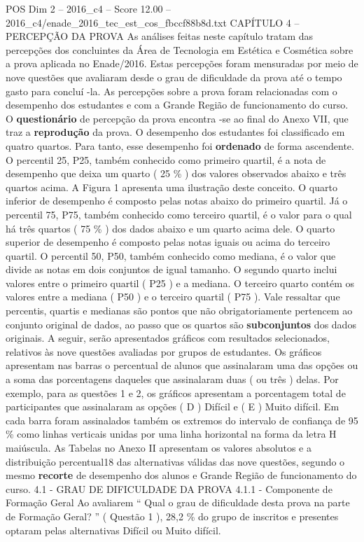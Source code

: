 \begin{textsample}{POS Dim 2 – 2016\_c4 – Score 12.00 – 2016\_c4/enade\_2016\_tec\_est\_cos\_fbccf88b8d.txt}  \label{ex:f2_pos_071}
CAPÍTULO 4 – PERCEPÇÃO DA PROVA As análises feitas neste capítulo tratam das percepções dos concluintes da Área de Tecnologia em Estética e Cosmética sobre a prova aplicada no Enade/2016.
Estas percepções foram mensuradas por meio de nove questões que avaliaram desde o grau de dificuldade da prova até o tempo gasto para concluí -la.
As percepções sobre a prova foram relacionadas com o desempenho dos estudantes e com a Grande Região de funcionamento do curso.
O \textbf{questionário} de percepção da prova encontra -se ao final do Anexo VII, que traz a \textbf{reprodução} da prova.
O desempenho dos estudantes foi classificado em quatro quartos.
Para tanto, esse desempenho foi \textbf{ordenado} de forma ascendente.
O percentil 25, P25, também conhecido como primeiro quartil, é a nota de desempenho que deixa um quarto ( 25 \% ) dos valores observados abaixo e três quartos acima.
A Figura 1 apresenta uma ilustração deste conceito.
O quarto inferior de desempenho é composto pelas notas abaixo do primeiro quartil.
Já o percentil 75, P75, também conhecido como terceiro quartil, é o valor para o qual há três quartos ( 75 \% ) dos dados abaixo e um quarto acima dele.
O quarto superior de desempenho é composto pelas notas iguais ou acima do terceiro quartil.
O percentil 50, P50, também conhecido como mediana, é o valor que divide as notas em dois conjuntos de igual tamanho.
O segundo quarto inclui valores entre o primeiro quartil ( P25 ) e a mediana.
O terceiro quarto contém os valores entre a mediana ( P50 ) e o terceiro quartil ( P75 ).
Vale ressaltar que percentis, quartis e medianas são pontos que não obrigatoriamente pertencem ao conjunto original de dados, ao passo que os quartos são \textbf{subconjuntos} dos dados originais.
A seguir, serão apresentados gráficos com resultados selecionados, relativos às nove questões avaliadas por grupos de estudantes.
Os gráficos apresentam nas barras o percentual de alunos que assinalaram uma das opções ou a soma das porcentagens daqueles que assinalaram duas ( ou três ) delas.
Por exemplo, para as questões 1 e 2, os gráficos apresentam a porcentagem total de participantes que assinalaram as opções ( D ) Difícil e ( E ) Muito difícil.
Em cada barra foram assinalados também os extremos do intervalo de confiança de 95 \% como linhas verticais unidas por uma linha horizontal na forma da letra H maiúscula.
As Tabelas no Anexo II apresentam os valores absolutos e a distribuição percentual18 das alternativas válidas das nove questões, segundo o mesmo \textbf{recorte} de desempenho dos alunos e Grande Região de funcionamento do curso. 4.1 - GRAU DE DIFICULDADE DA PROVA 4.1.1 - Componente de Formação Geral Ao avaliarem “ Qual o grau de dificuldade desta prova na parte de Formação Geral? ” ( Questão 1 ), 28,2 \% do grupo de inscritos e presentes optaram pelas alternativas Difícil ou Muito difícil.

\end{textsample}
